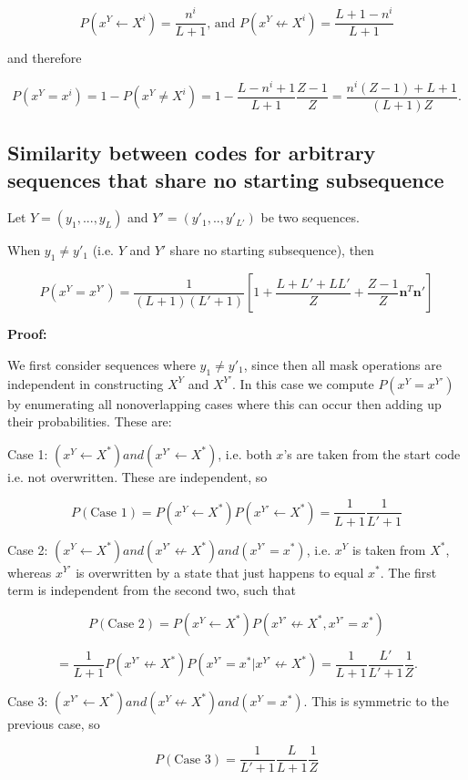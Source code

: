 \documentclass{article}
\begin{document}
$$P(x^Y \leftarrow X^i) = \frac{n^i}{L+1} \textrm{, and } P(x^Y \not\leftarrow X^i) = \frac{L+1-n^i}{L+1}$$

and therefore 

$$P(x^Y = x^i) = 1 - P(x^Y \neq X^i) = 1 - \frac{L-n^i+1}{L+1}\frac{Z-1}{Z} = \frac{n^i(Z-1) + L + 1}{(L+1)Z}.$$

\subsection{Similarity between codes for arbitrary sequences that share no starting subsequence}

Let $Y = (y_1, ..., y_L)$ and $Y' = (y'_1, .., y'_{L'})$ be two sequences. 

When $y_1 \neq y'_1$ (i.e. $Y$ and $Y'$ share no starting subsequence), then

$$P(x^Y = x^{Y'}) = \frac{1}{(L+1)(L'+1)}\left[1 + \frac{L + L' + LL'}{Z} + \frac{Z-1}{Z}\mathbf{n}^T\mathbf{n}'\right]$$

\textbf{Proof:}

We first consider sequences where $y_1 \neq y'_1$, since then all mask operations are independent in constructing $X^Y$ and $X^{Y'}$. In this case we compute $P(x^Y = x^{Y'})$ by enumerating all nonoverlapping cases where this can occur then adding up their probabilities. These are:

Case 1: $(x^Y \leftarrow X^*) and (x^{Y'} \leftarrow X^*)$, i.e. both $x$'s are taken from the start code i.e. not overwritten. These are independent, so

$$P(\textrm{Case 1}) = P(x^Y \leftarrow X^*)P(x^{Y'} \leftarrow X^*) = \frac{1}{L+1}\frac{1}{L'+1}$$

Case 2: $(x^Y \leftarrow X^*) and (x^{Y'} \not \leftarrow X^*) and (x^{Y'} = x^*)$, i.e. $x^Y$ is taken from $X^*$, whereas $x^{Y'}$ is overwritten by a state that just happens to equal $x^*$. The first term is independent from the second two, such that

$$P(\textrm{Case 2}) = P(x^Y \leftarrow X^*)P(x^{Y'} \not \leftarrow X^*, x^{Y'} = x^*)$$

$$ = \frac{1}{L+1}P(x^{Y'} \not \leftarrow X^*)P(x^{Y'} = x^*|x^{Y'} \not \leftarrow X^*) = \frac{1}{L+1}\frac{L'}{L'+1}\frac{1}{Z}.$$

Case 3: $(x^{Y'} \leftarrow X^*) and (x^Y \not \leftarrow X^*) and (x^Y = x^*)$. This is symmetric to the previous case, so 

$$P(\textrm{Case 3}) = \frac{1}{L'+1}\frac{L}{L+1}\frac{1}{Z}$$
\end{document}
